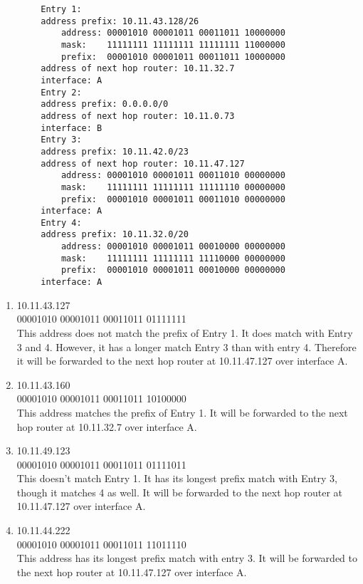 \documentclass[10pt]{amsart}
\begin{document}
\begin{enumerate}
        \begin{verbatim}
        Entry 1:
        address prefix: 10.11.43.128/26
            address: 00001010 00001011 00011011 10000000
            mask:    11111111 11111111 11111111 11000000
            prefix:  00001010 00001011 00011011 10000000
        address of next hop router: 10.11.32.7
        interface: A
        Entry 2:
        address prefix: 0.0.0.0/0
        address of next hop router: 10.11.0.73
        interface: B
        Entry 3:
        address prefix: 10.11.42.0/23 
        address of next hop router: 10.11.47.127
            address: 00001010 00001011 00011010 00000000
            mask:    11111111 11111111 11111110 00000000
            prefix:  00001010 00001011 00011010 00000000
        interface: A
        Entry 4:
        address prefix: 10.11.32.0/20
            address: 00001010 00001011 00010000 00000000
            mask:    11111111 11111111 11110000 00000000
            prefix:  00001010 00001011 00010000 00000000
        interface: A
        \end{verbatim}
        
        \begin{enumerate}
            \item 10.11.43.127\\
                00001010 00001011 00011011 01111111\\
                This address does not match the prefix of Entry 1.  It does
                match with Entry 3 and 4.  However, it has a longer match Entry
                3 than with entry 4.  Therefore it will be forwarded to the next
                hop router at 10.11.47.127 over interface A.
            \item 10.11.43.160\\
                00001010 00001011 00011011 10100000\\
                This address matches the prefix of Entry 1.  It will be
                forwarded to the next hop router at 10.11.32.7 over interface A.
            \item 10.11.49.123\\
                00001010 00001011 00011011 01111011\\
                This doesn't match Entry 1.  It has its longest prefix match
                with Entry 3, though it matches 4 as well.  It will be forwarded
                to the next hop router at 10.11.47.127 over interface A. 
            \item 10.11.44.222\\
                00001010 00001011 00011011 11011110\\
                This address has its longest prefix match with entry 3.  It will
                be forwarded to the next hop router at 10.11.47.127 over
                interface A. 
        \end{enumerate} 


\end{enumerate}
\end{document}
